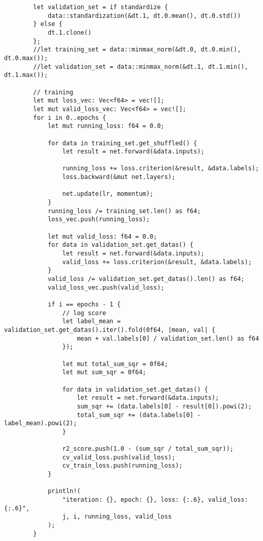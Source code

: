\begin{verbatim}
        let validation_set = if standardize {
            data::standardization(&dt.1, dt.0.mean(), dt.0.std())
        } else {
            dt.1.clone()
        };
        //let training_set = data::minmax_norm(&dt.0, dt.0.min(), dt.0.max());
        //let validation_set = data::minmax_norm(&dt.1, dt.1.min(), dt.1.max());

        // training
        let mut loss_vec: Vec<f64> = vec![];
        let mut valid_loss_vec: Vec<f64> = vec![];
        for i in 0..epochs {
            let mut running_loss: f64 = 0.0;

            for data in training_set.get_shuffled() {
                let result = net.forward(&data.inputs);

                running_loss += loss.criterion(&result, &data.labels);
                loss.backward(&mut net.layers);

                net.update(lr, momentum);
            }
            running_loss /= training_set.len() as f64;
            loss_vec.push(running_loss);

            let mut valid_loss: f64 = 0.0;
            for data in validation_set.get_datas() {
                let result = net.forward(&data.inputs);
                valid_loss += loss.criterion(&result, &data.labels);
            }
            valid_loss /= validation_set.get_datas().len() as f64;
            valid_loss_vec.push(valid_loss);

            if i == epochs - 1 {
                // log score
                let label_mean = validation_set.get_datas().iter().fold(0f64, |mean, val| {
                    mean + val.labels[0] / validation_set.len() as f64
                });

                let mut total_sum_sqr = 0f64;
                let mut sum_sqr = 0f64;

                for data in validation_set.get_datas() {
                    let result = net.forward(&data.inputs);
                    sum_sqr += (data.labels[0] - result[0]).powi(2);
                    total_sum_sqr += (data.labels[0] - label_mean).powi(2);
                }

                r2_score.push(1.0 - (sum_sqr / total_sum_sqr));
                cv_valid_loss.push(valid_loss);
                cv_train_loss.push(running_loss);
            }

            println!(
                "iteration: {}, epoch: {}, loss: {:.6}, valid_loss: {:.6}",
                j, i, running_loss, valid_loss
            );
        }


\end{verbatim}
